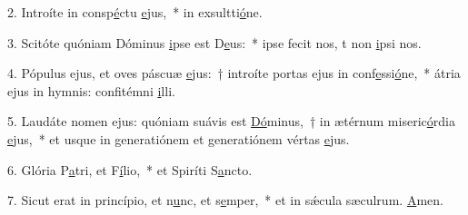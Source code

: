 2. Introíte in consp\uline{é}ctu \uline{e}jus,~* in exsultti\uline{ó}ne.\par 
3. Scitóte quóniam Dóminus \uline{i}pse est D\uline{e}us:~* ipse fecit nos, t non \uline{i}psi nos.\par 
4. Pópulus ejus, et oves páscuæ \uline{e}jus:~† introíte portas ejus in conf\uline{e}ssi\uline{ó}ne,~* átria ejus in hymnis: confitémni \uline{i}lli.\par 
5. Laudáte nomen ejus: quóniam suávis est \uline{Dó}minus,~† in ætérnum miseric\uline{ó}rdia \uline{e}jus,~* et usque in generatiónem et generatiónem vértas \uline{e}jus.\par 
6. Glória P\uline{a}tri, et F\uline{í}lio,~* et Spiríti S\uline{a}ncto.\par 
7. Sicut erat in princípio, et n\uline{u}nc, et s\uline{e}mper,~* et in sǽcula sæculrum. \uline{A}men.\par 
